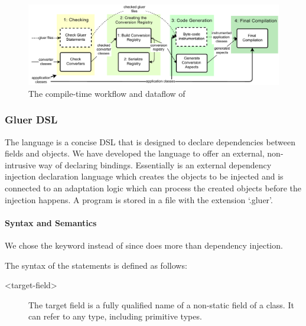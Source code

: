 \begin{figure}
\centering
\includegraphics[width=\textwidth]{chapteradapters/compiletime.pdf}
\caption{The compile-time workflow and dataflow of \zamk}
\label{fig:ctwf}
\end{figure}

\subsubsection{Gluer DSL}
\label{sec:adapter:gluer}
The \gluer language is a concise DSL that is designed to declare dependencies between fields and objects. 
We have developed the \gluer language to offer an external, non-intrusive way of declaring bindings. 
Essentially \gluer is an external dependency injection declaration language which creates the objects to be injected and is connected to an adaptation logic which can process the created objects before the  injection happens.
A \gluer program is stored in a file with the extension `.gluer'.

\paragraph{Syntax and Semantics} We chose the keyword  instead of  since \gluer does more than dependency injection. 

The syntax of the \gluer statements is defined as follows:


\begin{description}
\item[<target-field>] The target field is a fully qualified name of a non-static field of a class. 
It can refer to any type, including primitive types. 
\end{description}


